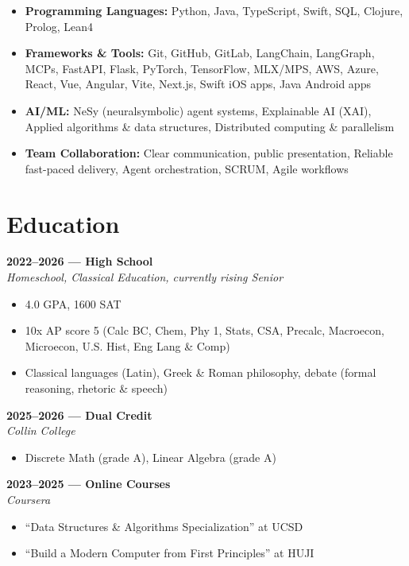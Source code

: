 \documentclass[11pt]{article}
\begin{document}
    \begin{itemize}
        \item \textbf{Programming Languages:} Python, Java, TypeScript, Swift, SQL, Clojure, Prolog, Lean4
        \item \textbf{Frameworks \& Tools:} Git, GitHub, GitLab, LangChain, LangGraph, MCPs, FastAPI, Flask, PyTorch, TensorFlow, MLX/MPS, AWS, Azure, React, Vue, Angular, Vite, Next.js, Swift iOS apps, Java Android apps
        \item \textbf{AI/ML:} NeSy (neuralsymbolic) agent systems, Explainable AI (XAI), Applied algorithms \& data structures, Distributed computing \& parallelism
        \item \textbf{Team Collaboration:} Clear communication, public presentation, Reliable fast-paced delivery, Agent orchestration, SCRUM, Agile workflows
    \end{itemize}

\vspace{0.4em}
\section*{Education}

    \textbf{2022--2026 --- High School} \\
    \textit{Homeschool, Classical Education, currently rising Senior}
    \vspace{-0.5em}
    \begin{itemize}
        \item 4.0 GPA, 1600 SAT 
        \item 10x AP score 5 (Calc BC, Chem, Phy 1, Stats, CSA, Precalc, Macroecon, Microecon, U.S. Hist, Eng Lang \& Comp)
        \item Classical languages (Latin), Greek \& Roman philosophy, debate (formal reasoning, rhetoric \& speech)
    \end{itemize}

    \vspace{0.25em}
    \textbf{2025--2026 --- Dual Credit} \\
    \textit{Collin College}
    \vspace{-0.5em}
    \begin{itemize}
        \item Discrete Math (grade A), Linear Algebra (grade A)
    \end{itemize}

    \vspace{0.25em}
    \textbf{2023--2025 --- Online Courses} \\
    \textit{Coursera}
    \vspace{-0.5em}
    \begin{itemize}
        \item ``Data Structures \& Algorithms Specialization'' at UCSD
        \item ``Build a Modern Computer from First Principles'' at HUJI
    \end{itemize}
\end{document}
